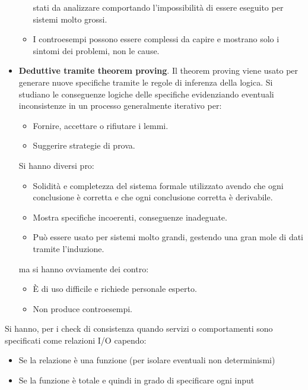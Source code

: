 \begin{itemize}
\begin{itemize}
                        stati da analizzare comportando l'impossibilità di essere
                        eseguito per sistemi molto grossi.
                  \item I controesempi possono essere complessi da capire e
                        mostrano solo i sintomi dei problemi, non le cause.
            \end{itemize}
      \item \textbf{Deduttive tramite theorem proving}. Il theorem proving viene
            usato per generare nuove specifiche tramite le regole di inferenza
            della logica. Si studiano le conseguenze logiche delle specifiche
            evidenziando eventuali inconsistenze in un processo generalmente
            iterativo per:
            \begin{itemize}
                  \item Fornire, accettare o rifiutare i lemmi.
                  \item Suggerire strategie di prova.
            \end{itemize}
            Si hanno diversi pro:
            \begin{itemize}
                  \item Solidità e completezza del sistema formale utilizzato
                        avendo che ogni conclusione è corretta e che ogni
                        conclusione corretta è derivabile.
                  \item Mostra specifiche incoerenti, conseguenze inadeguate.
                  \item Può essere usato per sistemi molto grandi, gestendo una
                        gran mole di dati tramite l'induzione.
            \end{itemize}
            ma si hanno ovviamente dei contro:
            \begin{itemize}
                  \item È di uso difficile e richiede personale esperto.
                  \item Non produce controesempi.
            \end{itemize}
\end{itemize}
Si hanno, per i check di consistenza quando servizi o comportamenti sono
specificati come relazioni I/O capendo:
\begin{itemize}
      \item Se la relazione è una funzione (per isolare eventuali non determinismi)
      \item Se la funzione è totale e quindi in grado di specificare ogni input
\end{itemize}

